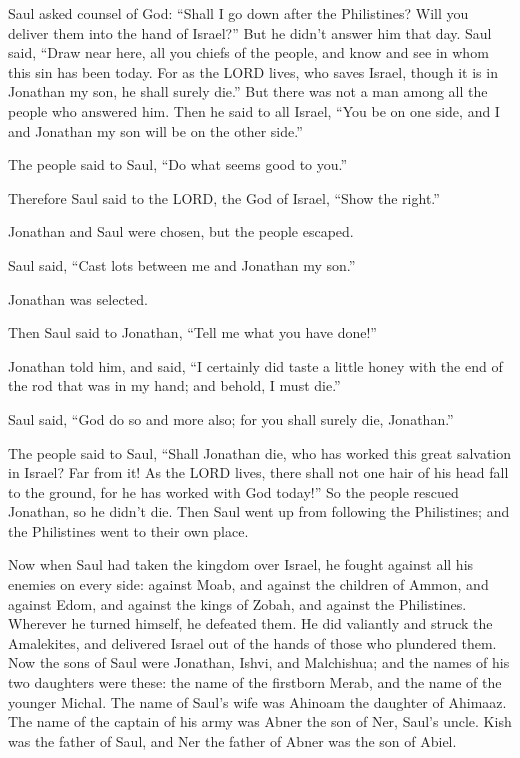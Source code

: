 \myverse{}Saul asked counsel of God: “Shall I go down after the Philistines?
Will you deliver them into the hand of Israel?” But he didn’t answer him that day.
\myverse{}Saul said, “Draw near here, all you chiefs of the people, and know and see
in whom this sin has been today.
\myverse{}For as the LORD lives, who saves Israel, though it is in Jonathan my son,
he shall surely die.” But there was not a man among all the people who answered him.
\myverse{}Then he said to all Israel, “You be on one side, and I and Jonathan my son
will be on the other side.”

The people said to Saul, “Do what seems good to you.”

\myverse{}Therefore Saul said to the LORD, the God of Israel, “Show the
right.”

Jonathan and Saul were chosen, but the people escaped.

\myverse{}Saul said, “Cast lots between me and Jonathan my son.”

Jonathan was selected.

\myverse{}Then Saul said to Jonathan, “Tell me what you have done!”

Jonathan told him, and said, “I certainly did taste a little honey with the end of the rod
that was in my hand; and behold, I must die.”

\myverse{}Saul said, “God do so and more also; for you shall surely die,
Jonathan.”

\myverse{}The people said to Saul, “Shall Jonathan die, who has worked
this great salvation in Israel? Far from it! As the LORD lives, there shall not one hair of his head fall
to the ground, for he has worked with God today!” So the people rescued Jonathan, so he didn’t die.
\myverse{}Then Saul went up from following the Philistines; and the Philistines went
to their own place.

\myverse{}Now when Saul had taken the kingdom over Israel, he fought against
all his enemies on every side: against Moab, and against the children of Ammon, and against Edom, and
against the kings of Zobah, and against the Philistines. Wherever he turned himself, he defeated them.
\myverse{}He did valiantly and struck the Amalekites, and delivered Israel out of the
hands of those who plundered them.
\myverse{}Now the sons of Saul were Jonathan, Ishvi, and Malchishua; and the names
of his two daughters were these: the name of the firstborn Merab, and the name of the younger Michal.
\myverse{}The name of Saul’s wife was Ahinoam the daughter of Ahimaaz. The name of
the captain of his army was Abner the son of Ner, Saul’s uncle.
\myverse{}Kish was the father of Saul, and Ner the father of Abner was the son of Abiel.

